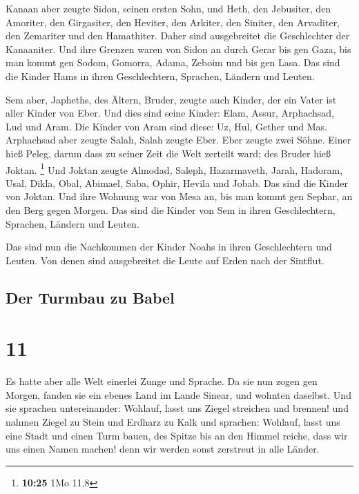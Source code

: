  Kanaan aber zeugte Sidon, seinen ersten Sohn, und Heth,
 den Jebusiter, den Amoriter, den Girgasiter,
 den Heviter, den Arkiter, den Siniter, 
den Arvaditer, den Zemariter und den Hamathiter. Daher sind ausgebreitet
die Geschlechter der Kanaaniter.  Und ihre Grenzen waren
von Sidon an durch Gerar bis gen Gaza, bis man kommt gen Sodom, Gomorra,
Adama, Zeboim und bis gen Lasa.  Das sind die Kinder Hams
in ihren Geschlechtern, Sprachen, Ländern und Leuten.

 Sem aber, Japheths, des Ältern, Bruder, zeugte auch
Kinder, der ein Vater ist aller Kinder von Eber.  Und
dies sind seine Kinder: Elam, Assur, Arphachsad, Lud und Aram.
 Die Kinder von Aram sind diese: Uz, Hul, Gether und Mas.
 Arphachsad aber zeugte Salah, Salah zeugte Eber.
 Eber zeugte zwei Söhne. Einer hieß Peleg, darum dass zu
seiner Zeit die Welt zerteilt ward; des Bruder hieß Joktan. \footnote{\textbf{10:25}
  1Mo 11,8}  Und Joktan zeugte Almodad, Saleph,
Hazarmaveth, Jarah,  Hadoram, Usal, Dikla,
 Obal, Abimael, Saba,  Ophir, Hevila und
Jobab. Das sind die Kinder von Joktan.  Und ihre Wohnung
war von Mesa an, bis man kommt gen Sephar, an den Berg gegen Morgen.
 Das sind die Kinder von Sem in ihren Geschlechtern,
Sprachen, Ländern und Leuten.

 Das sind nun die Nachkommen der Kinder Noahs in ihren
Geschlechtern und Leuten. Von denen sind ausgebreitet die Leute auf
Erden nach der Sintflut.

\hypertarget{der-turmbau-zu-babel}{%
\subsection{Der Turmbau zu Babel}\label{der-turmbau-zu-babel}}

\hypertarget{section-10}{%
\section{11}\label{section-10}}

 Es hatte aber alle Welt einerlei Zunge und Sprache.
 Da sie nun zogen gen Morgen, fanden sie ein ebenes Land
im Lande Sinear, und wohnten daselbst.  Und sie sprachen
untereinander: Wohlauf, lasst uns Ziegel streichen und brennen! und
nahmen Ziegel zu Stein und Erdharz zu Kalk  und sprachen:
Wohlauf, lasst uns eine Stadt und einen Turm bauen, des Spitze bis an
den Himmel reiche, dass wir uns einen Namen machen! denn wir werden
sonst zerstreut in alle Länder.

